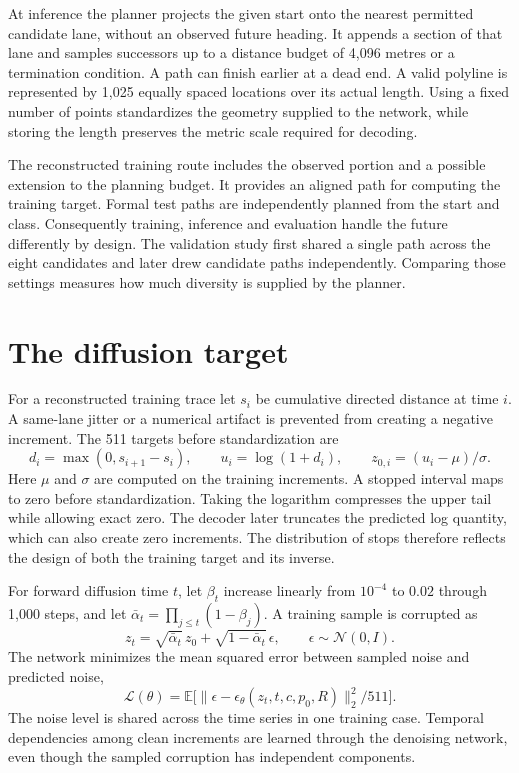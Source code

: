 At inference the planner projects the given start onto the nearest permitted candidate lane, without an observed future heading. It appends a section of that lane and samples successors up to a distance budget of 4,096 metres or a termination condition. A path can finish earlier at a dead end. A valid polyline is represented by 1,025 equally spaced locations over its actual length. Using a fixed number of points standardizes the geometry supplied to the network, while storing the length preserves the metric scale required for decoding.

The reconstructed training route includes the observed portion and a possible extension to the planning budget. It provides an aligned path for computing the training target. Formal test paths are independently planned from the start and class. Consequently training, inference and evaluation handle the future differently by design. The validation study first shared a single path across the eight candidates and later drew candidate paths independently. Comparing those settings measures how much diversity is supplied by the planner.

\section{The diffusion target}
For a reconstructed training trace let $s_i$ be cumulative directed distance at time $i$. A same-lane jitter or a numerical artifact is prevented from creating a negative increment. The 511 targets before standardization are
\begin{equation}
 d_i=\max(0,s_{i+1}-s_i),\qquad u_i=\log(1+d_i),\qquad z_{0,i}=(u_i-\mu)/\sigma .
 \label{eq:target}
\end{equation}
Here $\mu$ and $\sigma$ are computed on the training increments. A stopped interval maps to zero before standardization. Taking the logarithm compresses the upper tail while allowing exact zero. The decoder later truncates the predicted log quantity, which can also create zero increments. The distribution of stops therefore reflects the design of both the training target and its inverse.

For forward diffusion time $t$, let $\beta_t$ increase linearly from $10^{-4}$ to $0.02$ through 1,000 steps, and let $\bar\alpha_t=\prod_{j\leq t}(1-\beta_j)$. A training sample is corrupted as
\begin{equation}
 z_t=\sqrt{\bar\alpha_t}\,z_0+\sqrt{1-\bar\alpha_t}\,\epsilon,\qquad
 \epsilon\sim\mathcal N(0,I).
\end{equation}
The network minimizes the mean squared error between sampled noise and predicted noise,
\begin{equation}
 \mathcal L(\theta)=
 \mathbb E\big[\|\epsilon-\epsilon_\theta(z_t,t,c,p_0,R)\|_2^2/511\big].
\end{equation}
The noise level is shared across the time series in one training case. Temporal dependencies among clean increments are learned through the denoising network, even though the sampled corruption has independent components.

